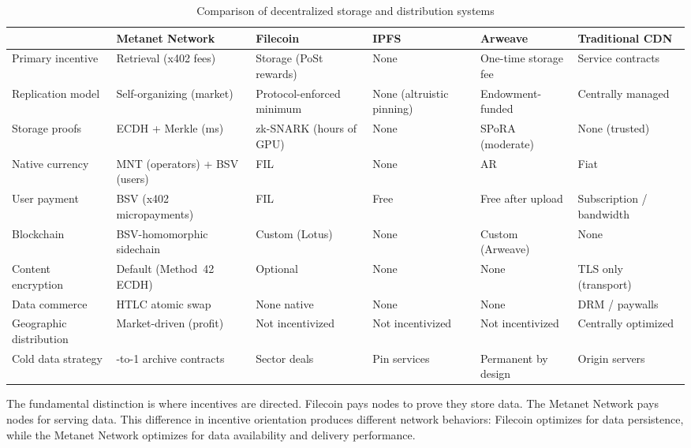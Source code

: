 \documentclass[11pt,a4paper]{article}
\begin{document}
\begin{table}[htbp]
\centering
\small
\setlength{\tabcolsep}{4pt}
\begin{tabularx}{\textwidth}{@{}l >{\raggedright\arraybackslash}X >{\raggedright\arraybackslash}X >{\raggedright\arraybackslash}X >{\raggedright\arraybackslash}X >{\raggedright\arraybackslash}X@{}}
\toprule
 & \textbf{Metanet Network} & \textbf{Filecoin} & \textbf{IPFS} & \textbf{Arweave} & \textbf{Traditional CDN} \\
\midrule
Primary incentive & Retrieval (x402 fees) & Storage (PoSt rewards) & None & One-time storage fee & Service contracts \\
\addlinespace
Replication model & Self-organizing (market) & Protocol-enforced minimum & None (altruistic pinning) & Endowment-funded & Centrally managed \\
\addlinespace
Storage proofs & ECDH + Merkle (ms) & zk-SNARK (hours of GPU) & None & SPoRA (moderate) & None (trusted) \\
\addlinespace
Native currency & MNT (operators) + BSV (users) & FIL & None & AR & Fiat \\
\addlinespace
User payment & BSV (x402 micropayments) & FIL & Free & Free after upload & Subscription / bandwidth \\
\addlinespace
Blockchain & BSV-homo\-morphic sidechain & Custom (Lotus) & None & Custom (Arweave) & None \\
\addlinespace
Content encryption & Default (Method~42 ECDH) & Optional & None & None & TLS only (transport) \\
\addlinespace
Data commerce & HTLC atomic swap & None native & None & None & DRM / paywalls \\
\addlinespace
Geographic distribution & Market-driven (profit) & Not incentivized & Not incentivized & Not incentivized & Centrally optimized \\
\addlinespace
Cold data strategy & 1-to-1 archive contracts & Sector deals & Pin services & Permanent by design & Origin servers \\
\bottomrule
\end{tabularx}
\caption{Comparison of decentralized storage and distribution systems}
\end{table}

The fundamental distinction is where incentives are directed. Filecoin pays nodes to prove they store data. The Metanet Network pays nodes for serving data. This difference in incentive orientation produces different network behaviors: Filecoin optimizes for data persistence, while the Metanet Network optimizes for data availability and delivery performance.
\end{document}
